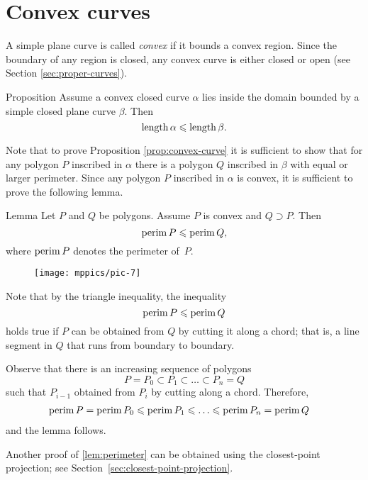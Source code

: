 \section{Convex curves}

A simple plane curve is called \emph{convex} if it bounds a convex region.
Since the boundary of any region is closed, any convex curve is either closed or open (see Section \ref{sec:proper-curves}).

\begin{thm}{Proposition}\label{prop:convex-curve}
Assume a convex closed curve $\alpha$ lies inside the domain bounded by a simple closed plane curve $\beta$.
Then
\[\mathop{\rm length}\nolimits\alpha\leqslant \mathop{\rm length}\nolimits\beta.\]
\end{thm}

Note that to prove Proposition \ref{prop:convex-curve} it is sufficient to show that for any polygon  $P$ inscribed in $\alpha$ there is a polygon $Q$ inscribed in $\beta$ with equal or larger perimeter. Since any polygon $P$ inscribed in $\alpha$ is convex, it is sufficient to prove the following lemma.


\begin{thm}{Lemma}\label{lem:perimeter}
Let $P$ and $Q$ be polygons.
Assume $P$ is convex and $Q\supset P$.
Then 
\[\mathop{\rm perim}\nolimits P\leqslant \mathop{\rm perim}\nolimits Q,\]
where $\mathop{\rm perim}\nolimits P$ denotes the perimeter of~$P$.
\end{thm}


\begin{wrapfigure}{o}{24 mm}
\vskip-0mm
\centering
\texttt{[image: mppics/pic-7]}
\vskip0mm
\end{wrapfigure}

Note that by the triangle inequality,
the inequality
\[\mathop{\rm perim}\nolimits P\leqslant \mathop{\rm perim}\nolimits Q\]
holds true
if $P$ can be obtained from $Q$ by cutting it along a chord;
that is, a line segment in $Q$ that runs from boundary to boundary.

Observe that there is an increasing sequence of polygons 
$$P=P_0\subset P_1\subset\dots\subset P_n=Q$$
such that $P_{i-1}$ obtained from $P_{i}$ by cutting along a chord.
Therefore, 
\begin{align*}
\perim P=\perim P_0&\le\perim P_1\le\dots\le\perim P_n=\perim Q
\end{align*}
and the lemma follows.
\qeds

Another proof of \ref{lem:perimeter} can be obtained using the closest-point projection; see Section~\ref{sec:closest-point-projection}.  

